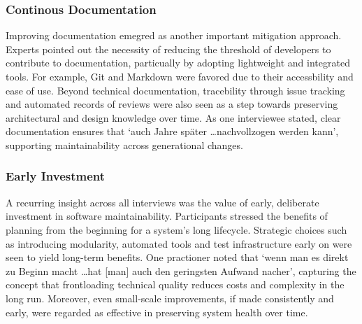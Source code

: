 \subsubsection{Continous Documentation}
Improving documentation emegred as another important mitigation approach. Experts pointed out the necessity of reducing the threshold of developers to contribute to documentation, particually by adopting lightweight and integrated tools. For example, Git and Markdown were favored due to their accessbility and ease of use.
Beyond technical documentation, tracebility through issue tracking and automated records of reviews were also seen as a step towards preserving architectural and design knowledge over time. As one interviewee stated, clear documentation ensures that `auch Jahre später \ldots nachvollzogen werden kann', supporting maintainability across generational changes.\\

\subsubsection{Early Investment}
A recurring insight across all interviews was the value of early, deliberate investment in software maintainability. Participants stressed the benefits of planning from the beginning for a system's long lifecycle. Strategic choices such as introducing modularity, automated tools and test infrastructure early on were seen to yield long-term benefits.
One practioner noted that `wenn man es direkt zu Beginn macht \ldots hat [man] auch den geringsten Aufwand nacher', capturing the concept that frontloading technical quality reduces costs and complexity in the long run. Moreover, even small-scale improvements, if made consistently and early, were regarded as effective in preserving system health over time.\\

